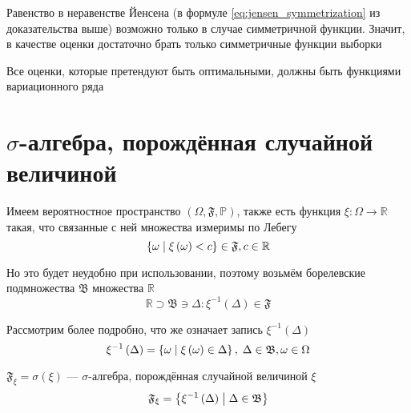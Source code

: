 \begin{remark}
  Равенство в неравенстве Йенсена (в формуле \eqref{eq:jensen_symmetrization}
  из доказательства выше)
  возможно только в случае симметричной функции.
  Значит,
  в качестве оценки достаточно брать только симметричные функции выборки
\end{remark}

\begin{comment}
\begin{definition}[Функция вариационного ряда]\index{функция!вариационного ряда}
  Если оценка $\hat{\theta}$ симметрична относительно перестановок аргументов,
  то она является функцией вариационного ряда
\end{definition}
\end{comment}

\begin{remark}
  Все оценки, которые претендуют быть оптимальными,
  должны быть функциями вариационного ряда
\end{remark}

\section{$\sigma$-алгебра, порождённая случайной величиной}
Имеем вероятностное пространство
$\left( \Omega, \mathfrak{F}, \mathbb{P} \right)$,
также есть функция $\xi: \Omega\rightarrow\mathbb{R}$
такая, что связанные с ней множества измеримы по Лебегу
$$\left\{\omega
  \;\middle|\; \xi\left(\omega\right) < c\right\} \in \mathfrak{F}, c\in \mathbb{R}$$

Но это будет неудобно при использовании,
поэтому возьмём борелевские подмножества $\mathfrak{B}$ множества $\mathbb{R}$
$$\mathbb{R}\supset\mathfrak{B}\ni\Delta:
  \xi^{-1}\left( \Delta \right) \in \mathfrak{F}$$

Рассмотрим более подробно,
что же означает запись $\xi^{-1}\left( \Delta \right)$
$$\xi^{-1}\left( \Delta \right)
  = \left\{ \omega \;\middle|\; \xi\left( \omega \right) \in \Delta \right\},\;
      \Delta\in\mathfrak{B}, \omega\in\Omega$$

\begin{definition}
  $\mathfrak{F}_\xi = \sigma\left( \xi \right)$
  --- $\sigma$-алгебра, порождённая случайной величиной $\xi$
  $$\mathfrak{F}_\xi
      = \left\{ \xi^{-1}\left( \Delta \right)
      \;\middle|\; \Delta\in\mathfrak{B} \right\}$$
\end{definition}

